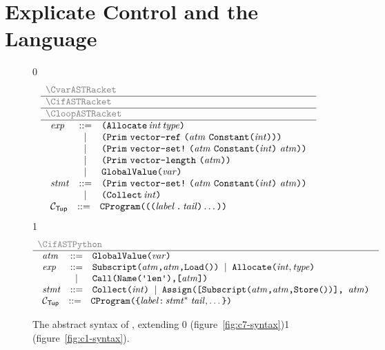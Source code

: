 \documentclass[7x10]{TimesAPriori_MIT}%
\newcommand{\gray}[1]{{\color{gray} #1}}
\def\racketEd{0}
\def\pythonEd{1}
\def\edition{1}
\newcommand{\racket}[1]{{\if\edition\racketEd{#1}\fi}}
\newcommand{\pythonColor}[0]{}
\newcommand{\python}[1]{{\if\edition\pythonEd\pythonColor #1\fi}}
\numberwithin{theorem}{chapter}
\numberwithin{definition}{chapter}
\numberwithin{equation}{chapter}
\begin{document}
\section{Explicate Control and the \LangCVec{} Language}
\label{sec:explicate-control-r3}


\newcommand{\CtupASTRacket}{
\begin{array}{lcl}
\Exp &::= & \LP\key{Allocate} \,\itm{int}\,\itm{type}\RP \\
   &\MID& \VECREF{\Atm}{\INT{\Int}}  \\
   &\MID& \VECSET{\Atm}{\INT{\Int}}{\Atm} \\
   &\MID& \VECLEN{\Atm} \\
   &\MID& \GLOBALVALUE{\Var} \\
\Stmt &::=& \VECSET{\Atm}{\INT{\Int}}{\Atm} \\
    &\MID& \LP\key{Collect} \,\itm{int}\RP 
\end{array}
}
  
\newcommand{\CtupASTPython}{
\begin{array}{lcl}
\Atm &::=& \GLOBALVALUE{\Var} \\  
\Exp &::=& \GET{\Atm}{\Atm} \MID \ALLOCATE{\Int}{\Type} \\
      &\MID& \LEN{\Atm} \\
\Stmt &::=& \COLLECT{\Int} 
     \MID \ASSIGN{\PUT{\Atm}{\Atm}}{\Atm} 
\end{array}
}

\begin{figure}[tp]
  \begin{tcolorbox}[colback=white]
    \small
{\if\edition\racketEd    
\[
\begin{array}{l}
  \gray{\CvarASTRacket} \\ \hline
  \gray{\CifASTRacket} \\ \hline
  \gray{\CloopASTRacket} \\ \hline
  \CtupASTRacket \\
  \begin{array}{lcl}
    \LangCVecM{} & ::= & \CPROGRAM{\itm{info}}{\LP\LP\itm{label}\,\key{.}\,\Tail\RP\ldots\RP}
  \end{array}
\end{array}
\]
\fi}
{\if\edition\pythonEd\pythonColor
\[
\begin{array}{l}
  \gray{\CifASTPython} \\ \hline
  \CtupASTPython \\
\begin{array}{lcl}
\LangCVecM{} & ::= & \CPROGRAM{\itm{info}}{\LC\itm{label}\key{:}\,\Stmt^{*}\;\Tail, \ldots \RC}
\end{array}
\end{array}
\]
\fi}
  \end{tcolorbox}

\caption{The abstract syntax of \LangCVec{}, extending
  \racket{\LangCLoop{} (figure~\ref{fig:c7-syntax})}\python{\LangCIf{}
  (figure~\ref{fig:c1-syntax})}.}
\label{fig:c2-syntax}
\end{figure}
\end{document}
